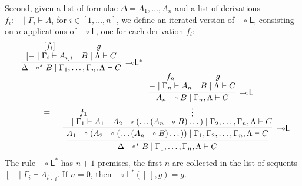 \documentclass[sn-mathphys-num]{sn-jnl}%
\newcommand{\ldbc}{[\![}
\newcommand{\rdbc}{]\!]}
\newcommand{\GG}{\Gamma}
\newcommand{\GD}{\Delta}
\newcommand{\GL}{\Lambda}
\newcommand{\vd}{\vdash}
\newcommand{\lolli}{\multimap}
\newcommand{\lleft}{{\lolli}\mathsf{L}}
\newcommand{\lright}{{\lolli}\mathsf{R}}
\newcommand{\proofbox}[1]{\begin{tabular}{l} #1 \end{tabular}}
\theoremstyle{thmstyleone}%
\theoremstyle{thmstyletwo}%
\theoremstyle{thmstylethree}%
\newtheorem{definition}[theorem]{Definition}%
\begin{document}
Second, given a list of formulae $\GD = A_1,\dots,A_n$ and a list of derivations $f_i : {-} \mid \GG_i \vd A_i$ for $i \in [1,\dots , n]$, we define an iterated version of $\lleft$, consisting on $n$ applications of $\lleft$, one for each derivation $f_i$:
\begin{equation}\label{-oL*}
  \begin{array}{l}
    \proofbox{\infer[\lleft^*]{\GD \lolli^* B \mid \GG_1,\dots,\GG_n,\GL \vd C}{
    \deduce{[ {-} \mid \GG_i \vd A_i]_i}{[f_i]}
    &
    \deduce{B \mid \GL \vd C}{g}
    }}
    \\
    \qquad \qquad =
    \proofbox{
    \infer={\GD \lolli^* B \mid \GG_1,\dots,\GG_n,\GL \vd C}{
    \infer[\lleft]{A_1 \lolli (A_2 \lolli (\dots (A_n \lolli B) \dots )) \mid \GG_1,\GG_2,\dots,\GG_n,\GL \vd C}{
    \deduce{{-} \mid \GG_1 \vd A_1}{f_1}
    &
    \deduce[\vdots]{A_2 \lolli (\dots (A_n \lolli B) \dots ) \mid \GG_2,\dots,\GG_n,\GL \vd C}{
    \infer[\lleft]{A_n \lolli B \mid \GG_n , \GL \vd C}{
    \deduce{{-} \mid \GG_n \vd A_n}{f_n}
    &
    \deduce{B \mid \GL \vd C}{g}
    }
    }
    }
    }
    }
  \end{array}
\end{equation}
The rule $\lleft^*$ has $n+1$ premises, the first $n$ are collected in the list of sequents $[ {-} \mid \GG_i \vd A_i]_i$.
If $n=0$, then $\lleft^* ([\ ],g) = g$.

\end{document}
